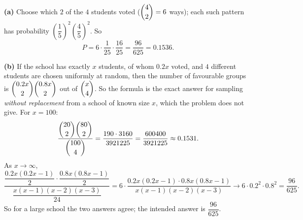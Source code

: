 \textbf{(a)} Choose which $2$ of the $4$ students voted ($\dbinom42=6$ ways); each such pattern has probability $\left(\dfrac15\right)^2\left(\dfrac45\right)^2$. So
\[P=6\cdot\dfrac{1}{25}\cdot\dfrac{16}{25}=\boxed{\dfrac{96}{625}}=0.1536.\]

\textbf{(b)} If the school has exactly $x$ students, of whom $0.2x$ voted, and $4$ different students are chosen uniformly at random, then the number of favourable groups is $\dbinom{0.2x}{2}\dbinom{0.8x}{2}$ out of $\dbinom x4$. So the formula is the exact answer for sampling \emph{without replacement} from a school of known size $x$, which the problem does not give. For $x=100$:
\[\dfrac{\dbinom{20}{2}\dbinom{80}{2}}{\dbinom{100}{4}}=\dfrac{190\cdot3160}{3921225}=\dfrac{600400}{3921225}\approx0.1531.\]
As $x\to\infty$,
\[\dfrac{\dfrac{0.2x(0.2x-1)}{2}\cdot\dfrac{0.8x(0.8x-1)}{2}}{\dfrac{x(x-1)(x-2)(x-3)}{24}}=6\cdot\dfrac{0.2x(0.2x-1)\cdot0.8x(0.8x-1)}{x(x-1)(x-2)(x-3)}\to6\cdot0.2^2\cdot0.8^2=\dfrac{96}{625}.\]
So for a large school the two answers agree; the intended answer is $\dfrac{96}{625}$.
